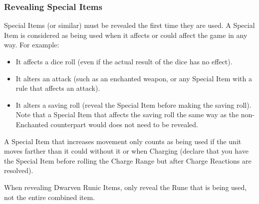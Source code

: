 \begin{optionalrules}
\subsubsection{Revealing Special Items}

Special Items (or similar) must be revealed the first time they are used. A Special Item is considered as being used when it affects or could affect the game in any way. For example:
\begin{itemize}
\item It affects a dice roll (even if the actual result of the dice has no effect).
\item It alters an attack (such as an enchanted weapon, or any Special Item with a rule that affects an attack).
\item It alters a saving roll (reveal the Special Item before making the saving roll). Note that a Special Item that affects the saving roll the same way as the non-Enchanted counterpart would does not need to be revealed.
\end{itemize}

A Special Item that increases movement only counts as being used if the unit moves farther than it could without it or when Charging (declare that you have the Special Item before rolling the Charge Range but after Charge Reactions are resolved).

When revealing Dwarven Runic Items, only reveal the Rune that is being used, not the entire combined item.
\end{optionalrules}\debugfooter %

